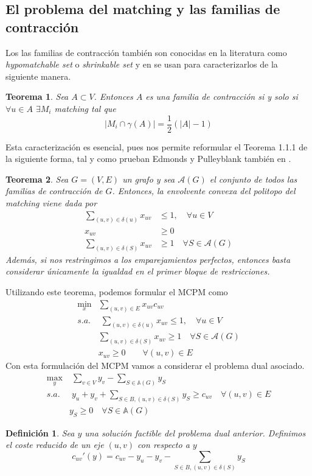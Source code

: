 \documentclass[twoside,a4paper,openright,12pt]{book}
\newtheorem{defi}{Definici\'on}[section]
\newtheorem{thm}{Teorema}[section]
\begin{document}
\subsection{El problema del matching y las familias de contracción}
Los las familias de contracción también son conocidas en la literatura como \textit{hypomatchable set} o \textit{shrinkable set} y en \cite{edmon3} se usan para caracterizarlos de la siguiente manera.
\begin{thm}
Sea $A \subset V$. Entonces $A$ es una familia de contracción si y solo si $\forall u \in A$ $\exists M_i$ matching tal que 
$$
|M_i\cap \gamma(A)| = \frac{1}{2}(|A|-1)
$$
\end{thm}
Esta caracterización es esencial, pues nos permite reformular el Teorema 1.1.1 de la siguiente forma, tal y como prueban Edmonds y Pulleyblank también en \cite{edmon3}.
\begin{thm}
Sea $G=(V,E)$ un grafo y sea $\mathcal{A}(G)$ el conjunto de todos las familias de contracción de $G$. Entonces, la envolvente convexa del politopo del matching viene dada por
\begin{align*}
\sum_{(u,v)\in\delta(u)} x_{uv} &\leq 1, \quad \forall u\in V\\
x_{uv} &\geq 0\\
\sum_{(u,v)\in \delta(S)} x_{uv}& \geq 1 \quad \forall S \in \mathcal{A}(G)	
\end{align*}
Además, si nos restringimos a los emparejamientos perfectos, entonces basta considerar únicamente la igualdad en el primer bloque de restricciones.
\end{thm}
Utilizando este teorema, podemos formular el MCPM como
\begin{align*}
\min_x & \sum_{(u,v) \in E}x_{uv}c_{uv}\\
s.a.&\;\sum_{(u,v)\in\delta(u)} x_{uv} \leq 1, \quad \forall u \in V\\
&\sum_{(u,v)\in \delta(S)} x_{uv} \geq 1\quad \forall S \in \mathcal{A}(G)	\\
&x_{uv} \geq 0 \qquad \forall(u,v)\in E
\end{align*}
Con esta formulación del MCPM vamos a considerar el problema dual asociado.
\begin{align*}
\max_{y} &\; \sum_{v\in V} y_v - \sum_{S\in \mathbb{A}(G)} y_S\\
s.a.&\;y_u+y_v + \sum_{S\in B,(u,v)\in \delta(S)}y_S  \geq c_{uv} \quad \forall (u,v)\in E\\
&y_S\geq 0 \quad \forall S\in \mathbb{A}(G)
\end{align*}
\begin{defi}
Sea $y$ una solución factible del problema dual anterior. Definimos el coste reducido de un eje $(u,v)$ con respecto a $y$
$$
c_{uv}'(y) = c_{uv} - y_u -y_v - \sum_{S\in B,(u,v)\in \delta(S)} y_S
$$ 
\end{defi}
\end{document}
